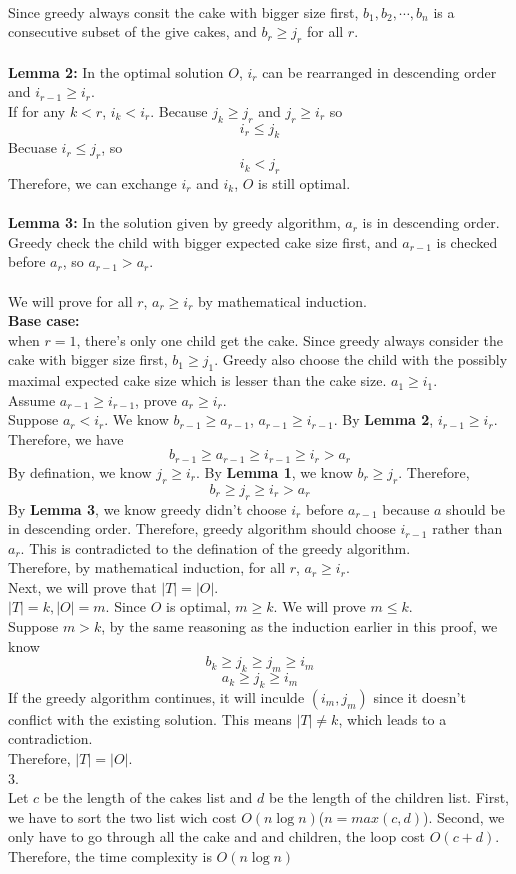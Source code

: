 \documentclass[10.5pt]{article}
\begin{document}
\\
Since greedy always consit the cake with bigger size first, $b_1, b_2, \cdots, b_n$ is a consecutive subset of the give cakes, and $b_r \ge j_r$ for all $r$.\\
\\
\textbf{Lemma 2:} In the optimal solution $O$, $i_r$ can be rearranged in descending order and $i_{r-1} \ge i_r$.\\
If for any $k < r$, $i_k < i_r$. Because $j_k \ge j_r$ and $j_r\ge i_r$ so
$$
	i_r \le j_k
$$
Becuase $i_r \le j_r$, so
$$
	i_k < j_r
$$
Therefore, we can exchange $i_r$ and $i_k$, $O$ is still optimal.\\
\\
\textbf{Lemma 3:} In the solution given by greedy algorithm, $a_r$ is in descending order.\\
Greedy check the child with bigger expected cake size first, and $a_{r-1}$ is checked before $a_r$, so $a_{r - 1} > a_r$.
\\
\\
We will prove for all $r$, $a_r \ge i_r$ by mathematical induction.\\
\textbf{Base case:}\\
when $r = 1$, there's only one child get the cake. Since greedy always consider the cake with bigger size first, $b_1 \ge j_1$.
Greedy also choose the child with the possibly maximal expected cake size which is lesser than the cake size. $a_1 \ge i_1$.
\\
Assume $a_{r - 1}\ge i_{r - 1}$, prove $a_r \ge i_r$.\\
Suppose $a_r < i_r$. We know $b_{r-1}\ge a_{r-1}$, $a_{r-1} \ge i_{r-1}$. By \textbf{Lemma 2}, $i_{r-1}\ge i_r$. Therefore, we have
$$
	b_{r-1} \ge a_{r-1} \ge i_{r - 1} \ge i_r > a_r
$$
By defination, we know $j_r \ge i_r$. By \textbf{Lemma 1}, we know $b_r \ge j_r$.
Therefore,
$$
	b_r \ge j_r \ge i_r > a_r
$$
By \textbf{Lemma 3}, we know greedy didn't choose $i_r$ before $a_{r - 1}$ because $a$ should be in descending order. Therefore, greedy algorithm should choose $i_{r-1}$ rather than $a_r$. This is contradicted to the defination of the greedy algorithm.\\
Therefore, by mathematical induction, for all $r$, $a_r \ge i_r$.
\\
Next, we will prove that $|T| = |O|$.\\
$|T| = k, |O| = m$. Since $O$ is optimal, $m \ge k$. We will prove $m \le k$.\\
Suppose $m > k$, by the same reasoning as the induction earlier in this proof, we know
$$
	b_k \ge j_k \ge j_m \ge i_m
$$
$$
	a_k \ge j_k \ge i_m
$$
If the greedy algorithm continues, it will inculde $(i_m, j_m)$ since it doesn't conflict with the existing solution. This means $|T| \ne k$, which leads to a contradiction.\\
Therefore, $|T| = |O|$.
\\
3.
\\
Let $c$ be the length of the cakes list and $d$ be the length of the children list.
First, we have to sort the two list wich cost $O(n\log n)$($n = max(c, d)$).
Second, we only have to go through all the cake and and children, the loop cost $O(c + d)$.
Therefore, the time complexity is $O(n\log n)$
\end{document}
